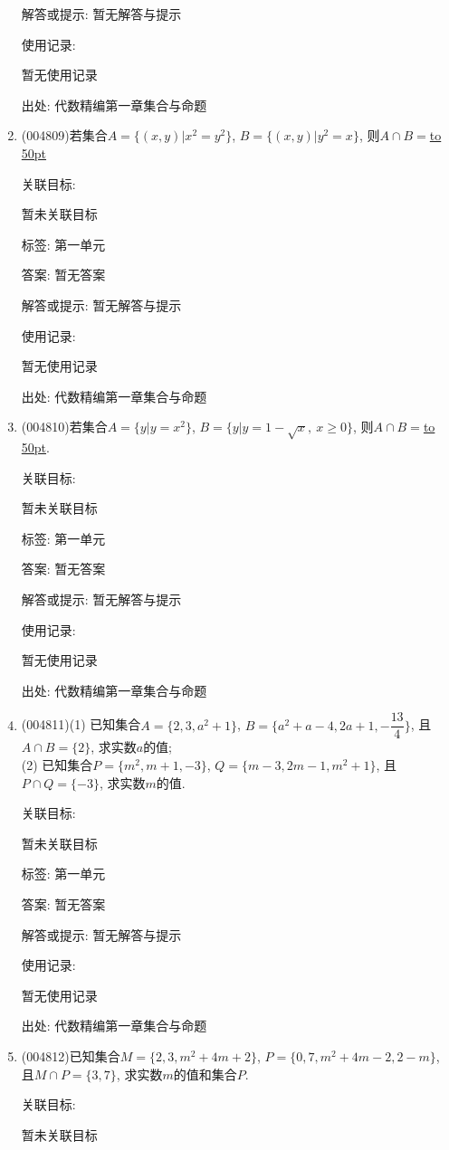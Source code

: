 \documentclass[10pt,a4paper]{article}
\newcommand{\blank}[1]{\underline{\hbox to #1pt{}}}
\begin{document}
\begin{enumerate}[1.]
解答或提示: 暂无解答与提示

使用记录:

暂无使用记录


出处: 代数精编第一章集合与命题
\item { (004809)}若集合$A=\{(x,y)|x^2=y^2\}$, $B=\{(x,y)|y^2=x\}$, 则$A\cap B=$\blank{50}


关联目标:

暂未关联目标



标签: 第一单元

答案: 暂无答案

解答或提示: 暂无解答与提示

使用记录:

暂无使用记录


出处: 代数精编第一章集合与命题
\item { (004810)}若集合$A=\{y|y =x^2\}$, $B=\{y|y=1-\sqrt x, \ x\ge 0\}$, 则$A\cap B=$\blank{50}.


关联目标:

暂未关联目标



标签: 第一单元

答案: 暂无答案

解答或提示: 暂无解答与提示

使用记录:

暂无使用记录


出处: 代数精编第一章集合与命题
\item { (004811)}(1) 已知集合$A=\{2,3,a^2+1\}$, $B=\{a^2+a-4,2a+1,-\dfrac{13}4\}$, 且$A\cap B=\{2\}$, 求实数$a$的值;\\
(2) 已知集合$P=\{m^2,m+1,-3\}$, $Q=\{m-3,2m-1,m^2+1\}$, 且$P\cap Q=\{-3\}$, 求实数$m$的值.


关联目标:

暂未关联目标



标签: 第一单元

答案: 暂无答案

解答或提示: 暂无解答与提示

使用记录:

暂无使用记录


出处: 代数精编第一章集合与命题
\item { (004812)}已知集合$M=\{2,3,m^2+4m+2\}$, $P=\{0,7,m^2+4m-2,2-m\}$, 且$M\cap P=\{3,7\}$, 求实数$m$的值和集合$P$.


关联目标:

暂未关联目标




\end{enumerate}
\end{document}

